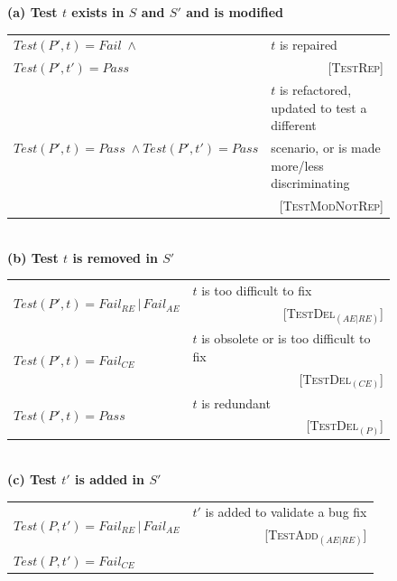 \documentclass[conference]{IEEEtran}
\newcommand{\mt}{\mathit}
\newcommand{\pass}{\mt{Pass}}
\newcommand{\fail}{\mt{Fail}}
\newcommand{\failce}{\mt{Fail}_{CE}}
\newcommand{\failre}{\mt{Fail}_{RE}}
\newcommand{\failae}{\mt{Fail}_{AE}}
\newcommand{\testfunc}[2]{\mt{Test(#1, #2)}}
\newcommand{\catrep}{\textsc{TestRep}}
\newcommand{\catref}{\textsc{TestModNotRep}}
\newcommand{\catdelaere}{\textsc{TestDel}$_\mt{(AE|RE)}$}
\newcommand{\catdelce}{\textsc{TestDel}$_\mt{(CE)}$}
\newcommand{\catdelp}{\textsc{TestDel}$_\mt{(P)}$}
\newcommand{\cataddaere}{\textsc{TestAdd}$_\mt{(AE|RE)}$}
\begin{document}
\begin{figure}[t]
\centering
\small
\tabcolsep=3pt
\textbf{(a) Test $t$ exists in $S$ and $S'$ and is modified}
\\ [2pt]
\begin{tabular}{|l||l|}
\hline
$\testfunc{P'}{t} = \fail \; \wedge$ &
$t$ is repaired \\
$\testfunc{P'}{t'} = \pass$ &
\multicolumn{1}{r|}{\scriptsize [\catrep{}]}\\
\hline
\multirow{3}{28mm}{$\testfunc{P'}{t} = \pass \; \wedge \testfunc{P'}{t'} = \pass$} &
$t$ is refactored, updated to test a different \\
& scenario, or is made more/less discriminating \\
& \multicolumn{1}{r|}{\scriptsize [\catref{}]} \\
\hline
\end{tabular}
\\ [8pt]
%
\textbf{(b) Test $t$ is removed in $S'$}
\\ [2pt]
\begin{tabular}{|l||l|}
\hline
\multirow{2}{*}{$\testfunc{P'}{t} = \failre \, | \, \failae$} &
$t$ is too difficult to fix \\
& \multicolumn{1}{r|}{\scriptsize [\catdelaere{}]} \\
\hline
\multirow{2}{*}{$\testfunc{P'}{t} = \failce$} & $t$ is obsolete or is
too difficult to fix \\
& \multicolumn{1}{r|}{\scriptsize [\catdelce{}]} \\
\hline
\multirow{2}{*}{$\testfunc{P'}{t} = \pass$} & $t$ is redundant \\
& \multicolumn{1}{r|}{\scriptsize [\catdelp{}]} \\
\hline 
\end{tabular}
\\ [8pt]
%
\textbf{(c) Test $t'$ is added in $S'$}
\\ [2pt]
\begin{tabular}{|l||l|}
  \hline
  \multirow{2}{*}{$\testfunc{P}{t'} = \failre \, | \, \failae$} &
  $t'$ is added to validate a bug fix \\
  & \multicolumn{1}{r|}{\scriptsize [\cataddaere{}]} \\
  \hline
  \multirow{3}{*}{$\testfunc{P}{t'} = \failce$} &

\end{tabular}
\end{figure}
\end{document}
